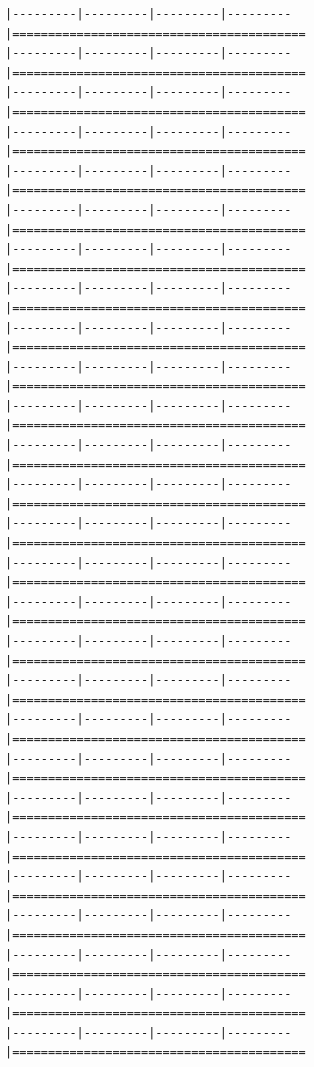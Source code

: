 \documentclass[
]{article}
\begin{document}
\begin{verbatim}
|---------|---------|---------|---------|=========================================                                          |---------|---------|---------|---------|=========================================                                          |---------|---------|---------|---------|=========================================                                          |---------|---------|---------|---------|=========================================                                          |---------|---------|---------|---------|=========================================                                          |---------|---------|---------|---------|=========================================                                          |---------|---------|---------|---------|=========================================                                          |---------|---------|---------|---------|=========================================                                          |---------|---------|---------|---------|=========================================                                          |---------|---------|---------|---------|=========================================                                          |---------|---------|---------|---------|=========================================                                          |---------|---------|---------|---------|=========================================                                          |---------|---------|---------|---------|=========================================                                          |---------|---------|---------|---------|=========================================                                          |---------|---------|---------|---------|=========================================                                          |---------|---------|---------|---------|=========================================                                          |---------|---------|---------|---------|=========================================                                          |---------|---------|---------|---------|=========================================                                          |---------|---------|---------|---------|=========================================                                          |---------|---------|---------|---------|=========================================                                          |---------|---------|---------|---------|=========================================                                          |---------|---------|---------|---------|=========================================                                          |---------|---------|---------|---------|=========================================                                          |---------|---------|---------|---------|=========================================                                          |---------|---------|---------|---------|=========================================                                          |---------|---------|---------|---------|=========================================                                          |---------|---------|---------|---------|=========================================             
\end{verbatim}
\end{document}
